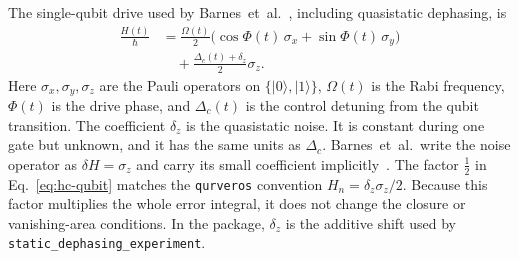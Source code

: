\documentclass[11pt,a4paper]{article}
\theoremstyle{definition}
\newcommand{\ket}[1]{\lvert #1\rangle}
\begin{document}
The single-qubit drive used by Barnes~et~al.~\cite{BarnesReview}, including
quasistatic dephasing, is
\begin{equation}
\label{eq:hc-qubit}
\begin{aligned}
  \frac{H(t)}{\hbar}
  &=\frac{\Omega(t)}{2}\bigl(\cos\Phi(t)\,\sigma_x+\sin\Phi(t)\,\sigma_y\bigr)\\
  &\quad+\frac{\Delta_c(t)+\delta_z}{2}\sigma_z.
\end{aligned}
\end{equation}
Here \(\sigma_x,\sigma_y,\sigma_z\) are the Pauli operators on
\(\{\ket0,\ket1\}\), \(\Omega(t)\) is the Rabi frequency, \(\Phi(t)\) is the
drive phase, and \(\Delta_c(t)\) is the control detuning from the qubit
transition.  The coefficient \(\delta_z\) is the quasistatic noise.  It is
constant during one gate but unknown, and it has the same units as
\(\Delta_c\).
Barnes~et~al.\ write the noise operator as \(\delta H=\sigma_z\) and carry its
small coefficient implicitly~\cite{BarnesReview}.  The factor \(\tfrac12\) in
Eq.~\eqref{eq:hc-qubit} matches the \texttt{qurveros} convention
\(H_n=\delta_z\sigma_z/2\).  Because this factor multiplies the whole error
integral, it does not change the closure or vanishing-area conditions.  In the
package, \(\delta_z\) is the additive shift used by
\texttt{static\_dephasing\_experiment}.
\end{document}
